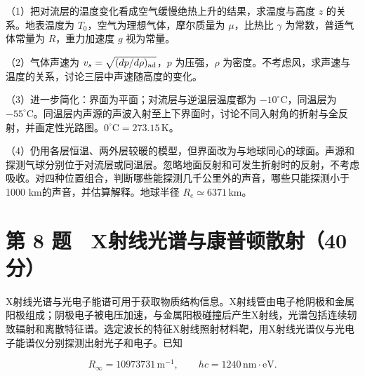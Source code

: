 \documentclass[12pt,a4paper,fontset=fandol]{ctexart}
\begin{document}
（1）把对流层的温度变化看成空气缓慢绝热上升的结果，求温度与高度 \(z\)
的关系。地表温度为 \(T_0\)，空气为理想气体，摩尔质量为 \(\mu\)，比热比
\(\gamma\) 为常数，普适气体常量为 \(R\)，重力加速度 \(g\) 视为常量。

（2）气体声速为 \(v_s=\sqrt{(dp/d\rho)_{\rm ad}}\)，\(p\)
为压强，\(\rho\)
为密度。不考虑风，求声速与温度的关系，讨论三层中声速随高度的变化。

（3）进一步简化：界面为平面；对流层与逆温层温度都为
\(-10^\circ\mathrm C\)，同温层为
\(-55^\circ\mathrm C\)。同温层内声源的声波入射至上下界面时，讨论不同入射角的折射与全反射，并画定性光路图。\(0^\circ\mathrm C=273.15\,\mathrm K\)。

（4）仍用各层恒温、两外层较暖的模型，但界面改为与地球同心的球面。声源和探测气球分别位于对流层或同温层。忽略地面反射和可发生折射时的反射，不考虑吸收。对四种位置组合，判断哪些能探测几千公里外的声音，哪些只能探测小于1000
km的声音，并估算解释。地球半径 \(R_e\simeq6371\,\mathrm{km}\)。

\clearpage

\section{第 8
题　X射线光谱与康普顿散射（40分）}\label{ux7b2c-8-ux9898-xux5c04ux7ebfux5149ux8c31ux4e0eux5eb7ux666eux987fux6563ux5c0440ux5206}

X射线光谱与光电子能谱可用于获取物质结构信息。X射线管由电子枪阴极和金属阳极组成；阴极电子被电压加速，与金属阳极碰撞后产生X射线，光谱包括连续轫致辐射和离散特征谱。选定波长的特征X射线照射材料靶，用X射线光谱仪与光电子能谱仪分别探测出射光子和电子。已知

\[R_\infty=10973731\,\mathrm{m^{-1}},\qquad
hc=1240\,\mathrm{nm\cdot eV}.\]

\begin{center}
\begin{minipage}{\linewidth}
\centering\begingroup{}
\ifdim\wd\diagrambox>.88\linewidth
\sbox{\diagrambox}{\resizebox{.88\linewidth}{!}{\usebox{\diagrambox}}}\fi
\ifdim\ht\diagrambox>.38\textheight
\resizebox{!}{.38\textheight}{\usebox{\diagrambox}}
\else\usebox{\diagrambox}\fi
\par{}\endgroup\end{minipage}\end{center}
\end{document}
